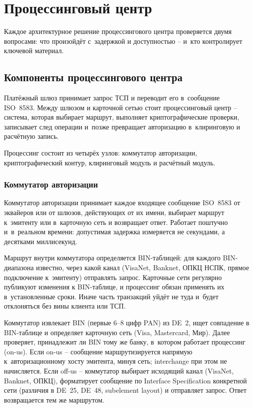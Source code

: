 
\chapter{Процессинговый центр}\label{ch:processing-center}
Каждое архитектурное решение процессингового центра проверяется
двумя вопросами: что произойдёт с~задержкой и доступностью --
и~кто контролирует ключевой материал.

\section{Компоненты процессингового центра}\label{sec:pc-components}

Платёжный шлюз принимает запрос ТСП и переводит его
в~сообщение ISO~8583. Между шлюзом и карточной сетью стоит
процессинговый центр -- система, которая выбирает маршрут,
выполняет криптографические проверки, записывает след операции
и~позже превращает авторизацию в~клиринговую и расчётную запись.


Процессинг состоит из четырёх узлов: коммутатор авторизации,
криптографический контур, клиринговый модуль и расчётный модуль.

\subsection*{Коммутатор авторизации}

Коммутатор авторизации принимает каждое входящее
сообщение ISO~8583 от эквайеров или от шлюзов, действующих
от их имени, выбирает маршрут к~эмитенту или в~карточную сеть
и возвращает ответ. Работает поштучно и~в~реальном времени:
допустимая задержка измеряется не секундами,
а десятками миллисекунд.~\cite{visa-core-rules,mc-tpr}

Маршрут внутри коммутатора определяется BIN-таблицей:
для каждого BIN-диапазона известно, через какой канал
(VisaNet, Banknet, ОПКЦ НСПК, прямое подключение к~эмитенту)
отправлять запрос. Карточные сети регулярно публикуют изменения
к BIN-таблице, и процессинг обязан применять их в~установленные сроки.
Иначе часть транзакций уйдёт не туда и~будет отклоняться без вины
клиента или ТСП.~\cite{visa-core-rules,mc-rules}

Коммутатор извлекает BIN (первые 6--8 цифр PAN) из DE~2,
ищет совпадение в BIN-таблице и определяет карточную сеть
(Visa, Mastercard, Мир). Далее проверяет, принадлежит ли BIN
тому же банку, в~котором работает процессинг (on-us). Если
on-us -- сообщение маршрутизируется напрямую к~авторизационному
хосту эмитента, минуя сеть; interchange при этом не начисляется.
Если off-us -- коммутатор выбирает исходящий канал
(VisaNet, Banknet, ОПКЦ), форматирует сообщение
по Interface Specification конкретной сети (различия
в DE~25, DE~48, subelement layout) и отправляет запрос.
Ответ возвращается тем же маршрутом.


